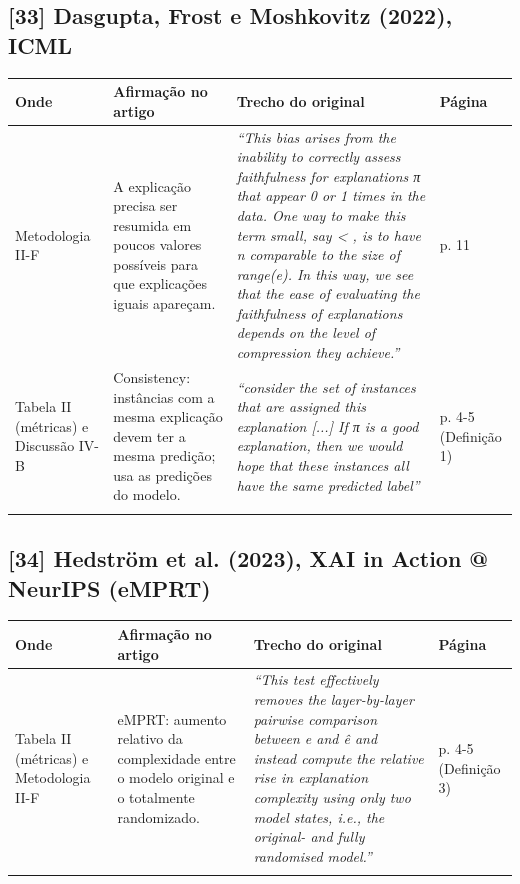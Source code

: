 \documentclass[11pt,a4paper]{article}
\begin{document}
\subsection*{[33] Dasgupta, Frost e Moshkovitz (2022), ICML}
\begin{longtable}{>{\raggedright\arraybackslash}p{2.6cm}>{\raggedright\arraybackslash}p{4.6cm}>{\raggedright\arraybackslash}p{7.6cm}>{\raggedright\arraybackslash}p{1.4cm}}
\toprule
\textbf{Onde} & \textbf{Afirmação no artigo} & \textbf{Trecho do original} & \textbf{Página} \\
\midrule
Metodologia II-F & A explicação precisa ser resumida em poucos valores possíveis para que explicações iguais apareçam. & \textit{``This bias arises from the inability to correctly assess faithfulness for explanations π that appear 0 or 1 times in the data. One way to make this term small, say < , is to have n comparable to the size of range(e). In this way, we see that the ease of evaluating the faithfulness of explanations depends on the level of compression they achieve.''} & p. 11 \\
\addlinespace
Tabela II (métricas) e Discussão IV-B & Consistency: instâncias com a mesma explicação devem ter a mesma predição; usa as predições do modelo. & \textit{``consider the set of instances that are assigned this explanation [...] If π is a good explanation, then we would hope that these instances all have the same predicted label''} & p. 4-5 (Definição 1) \\
\addlinespace
\bottomrule
\end{longtable}
\subsection*{[34] Hedström et al. (2023), XAI in Action @ NeurIPS (eMPRT)}
\begin{longtable}{>{\raggedright\arraybackslash}p{2.6cm}>{\raggedright\arraybackslash}p{4.6cm}>{\raggedright\arraybackslash}p{7.6cm}>{\raggedright\arraybackslash}p{1.4cm}}
\toprule
\textbf{Onde} & \textbf{Afirmação no artigo} & \textbf{Trecho do original} & \textbf{Página} \\
\midrule
Tabela II (métricas) e Metodologia II-F & eMPRT: aumento relativo da complexidade entre o modelo original e o totalmente randomizado. & \textit{``This test effectively removes the layer-by-layer pairwise comparison between e and ê and instead compute the relative rise in explanation complexity using only two model states, i.e., the original- and fully randomised model.''} & p. 4-5 (Definição 3) \\
\addlinespace
\bottomrule
\end{longtable}
\end{document}

